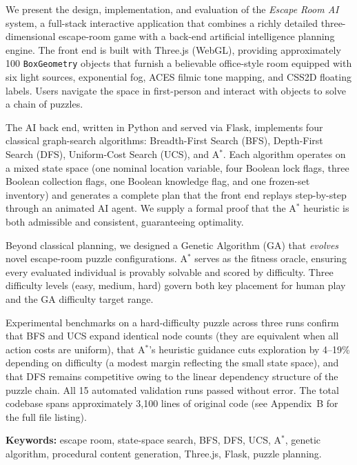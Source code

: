 \documentclass[12pt, a4paper]{report}
\begin{document}
We present the design, implementation, and evaluation of the \textit{Escape Room AI}
system, a full-stack interactive application that combines a richly detailed
three-dimensional escape-room game with a back-end artificial intelligence
planning engine.  The front end is built with Three.js (WebGL), providing
approximately 100 \texttt{BoxGeometry} objects that furnish a believable
office-style room equipped with six light sources, exponential fog, ACES
filmic tone mapping, and CSS2D floating labels.  Users navigate the space in
first-person and interact with objects to solve a chain of puzzles.

The AI back end, written in Python and served via Flask, implements four
classical graph-search algorithms: Breadth-First Search (BFS), Depth-First
Search (DFS), Uniform-Cost Search (UCS), and A$^{\ast}$.  Each algorithm
operates on a mixed state space (one nominal location variable, four Boolean lock flags, three Boolean collection flags, one Boolean knowledge flag, and one frozen-set inventory) and generates a complete plan
that the front end replays step-by-step through an animated AI agent.  We
supply a formal proof that the A$^{\ast}$ heuristic is both admissible and
consistent, guaranteeing optimality.

Beyond classical planning, we designed a Genetic Algorithm (GA) that
\emph{evolves} novel escape-room puzzle configurations.  A$^{\ast}$ serves as
the fitness oracle, ensuring every evaluated individual is provably solvable
and scored by difficulty.  Three difficulty levels (easy, medium, hard) govern
both key placement for human play and the GA difficulty target range.

Experimental benchmarks on a hard-difficulty puzzle across three runs confirm
that BFS and UCS expand identical node counts (they are equivalent when all
action costs are uniform), that A$^{\ast}$'s heuristic guidance cuts
exploration by 4--19\% depending on difficulty (a modest margin reflecting the small state space), and that DFS remains competitive owing to
the linear dependency structure of the puzzle chain.  All 15 automated
validation runs passed without error.  The total codebase spans approximately
3,100 lines of original code (see Appendix~B for the full file listing).

\vspace{0.5cm}
\noindent\textbf{Keywords:} escape room, state-space search, BFS, DFS, UCS,
A$^{\ast}$, genetic algorithm, procedural content generation, Three.js,
Flask, puzzle planning.
\end{document}
